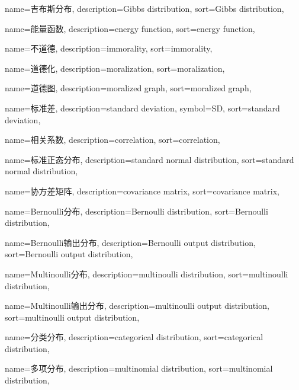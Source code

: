 {
  name=吉布斯分布,
  description={Gibbs distribution},
  sort={Gibbs distribution},
}

{
  name=能量函数,
  description={energy function},
  sort={energy function},
}

{
  name=不道德,
  description={immorality},
  sort={immorality},
}

{
  name=道德化,
  description={moralization},
  sort={moralization},
}

{
  name=道德图,
  description={moralized graph},
  sort={moralized graph},
}

{
  name=标准差,
  description={standard deviation},
  symbol={SD},
  sort={standard deviation},
}

{
  name=相关系数,
  description={correlation},
  sort={correlation},
}

{
  name=标准正态分布,
  description={standard normal distribution},
  sort={standard normal distribution},
}

{
  name=协方差矩阵,
  description={covariance matrix},
  sort={covariance matrix},
}

{
  name=Bernoulli分布,
  description={Bernoulli distribution},
  sort={Bernoulli distribution},
}

{
  name=Bernoulli输出分布,
  description={Bernoulli output distribution},
  sort={Bernoulli output distribution},
}

{
  name=Multinoulli分布,
  description={multinoulli distribution},
  sort={multinoulli distribution},
}

{
  name=Multinoulli输出分布,
  description={multinoulli output distribution},
  sort={multinoulli output distribution},
}

{
  name=分类分布,
  description={categorical distribution},
  sort={categorical distribution},
}

{
  name=多项分布,
  description={multinomial distribution},
  sort={multinomial distribution},
}

